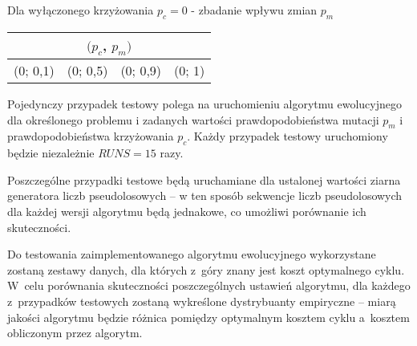 \documentclass[12pt, a4paper]{article}
\begin{document}
\bigskip

Dla wyłączonego krzyżowania $p_c = 0$ - zbadanie wpływu zmian $p_m$
\begin{center}
\begin{tabular}{|l|l|l|l|}
\hline
\multicolumn{4}{|c|}{$(p_c$, $p_m)$} \\
\hline
(0; 0,1) & (0; 0,5) & (0; 0,9) & (0; 1)\\
\hline
\end{tabular}
\end{center}

\bigskip
Pojedynczy przypadek testowy polega na uruchomieniu algorytmu ewolucyjnego dla określonego problemu i zadanych wartości prawdopodobieństwa mutacji $p_m$ i prawdopodobieństwa krzyżowania $p_c$. Każdy przypadek testowy uruchomiony będzie niezależnie $RUNS = 15$ razy.

Poszczególne przypadki testowe będą uruchamiane dla ustalonej wartości ziarna generatora liczb pseudolosowych -- w ten sposób sekwencje liczb pseudolosowych dla każdej wersji algorytmu będą jednakowe, co umożliwi porównanie ich skuteczności.

Do testowania zaimplementowanego algorytmu ewolucyjnego wykorzystane zostaną zestawy danych, dla których z~góry znany jest koszt optymalnego cyklu. W~celu porównania skuteczności poszczególnych ustawień algorytmu, dla każdego z~przypadków testowych zostaną wykreślone dystrybuanty empiryczne -- miarą jakości algorytmu będzie różnica pomiędzy optymalnym kosztem cyklu a~kosztem obliczonym przez algorytm.
 
\nocite{*}


\end{document}
